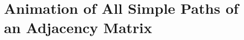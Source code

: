 \section{Animation of All Simple Paths of an Adjacency Matrix} %
\label{sec:animation_of_all_simple_paths_of_an_adjacency_matrix}

